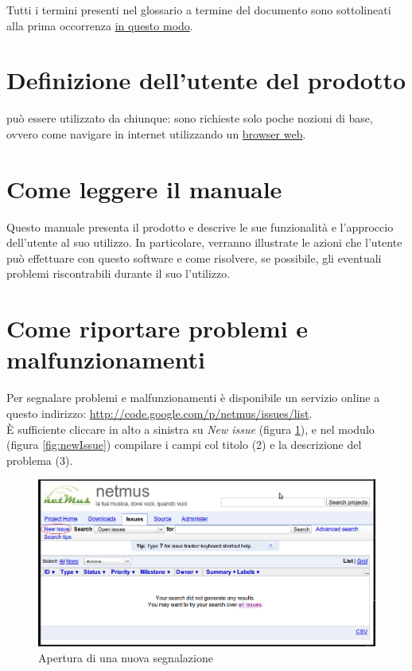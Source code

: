 Tutti i termini presenti nel glossario a termine del documento sono sottolineati
alla prima occorrenza \underline{in questo modo}.

\section{Definizione dell'utente del prodotto}
 pu\`o essere utilizzato da chiunque: sono richieste solo poche
nozioni di base, ovvero come navigare in internet utilizzando un
\underline{browser web}.

\section{Come leggere il manuale}
Questo manuale presenta il prodotto  e descrive le sue funzionalit\`a
e l'approccio dell'utente al suo utilizzo. In particolare, verranno illustrate
le azioni che l'utente pu\`o effettuare con questo software e come risolvere, se
possibile, gli eventuali problemi riscontrabili durante il suo l'utilizzo.

\section{Come riportare problemi e malfunzionamenti}
Per segnalare problemi e malfunzionamenti \`e disponibile un servizio online a
questo indirizzo: \url{http://code.google.com/p/netmus/issues/list}.\\
\`E sufficiente cliccare in alto a sinistra su \emph{New issue} (figura
\ref{fig:issues}), e nel modulo (figura \ref{fig:newIssue}) compilare i campi
col titolo (2) e la descrizione del problema (3).
\begin{figure}[!htbp]
  \centering
  \includegraphics[width=16cm]{img/MU/issues.png}
\caption{Apertura di una nuova segnalazione}
\label{fig:issues}
\end{figure}

